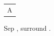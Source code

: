 \documentclass{article}
\begin{document}
\begin{tabular}{c}A\end{tabular}
\makeatletter Sep \the\col@sep, surround \the\extratabsurround.\makeatother
\end{document}
